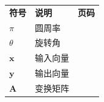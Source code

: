 \uestcsymbols

\begingroup
\renewcommand{\arraystretch}{1.3}
\setlength{\tabcolsep}{9pt}
\noindent
\begin{tabularx}{\linewidth}{%
    >{\normalsize}l
    >{\normalsize\raggedright\arraybackslash}X
    >{\normalsize}c}
    \textbf{符号} & \textbf{说明} & \textbf{页码} \\
    $\pi$ & 圆周率 & \pageref{sym:math-symbols} \\
    $\theta$ & 旋转角 & \pageref{sym:math-symbols} \\
    $\mathbf{x}$ & 输入向量 & \pageref{sym:math-symbols} \\
    $\mathbf{y}$ & 输出向量 & \pageref{sym:math-symbols} \\
    $\mathbf{A}$ & 变换矩阵 & \pageref{sym:math-symbols} \\
\end{tabularx}
\par
\endgroup
